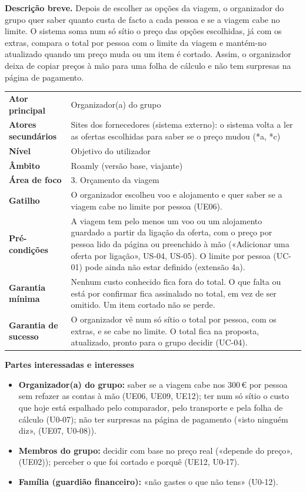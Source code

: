 \documentclass[11pt,a4paper]{article}
\newcommand{\reg}[1]{{\footnotesize\textcolor{pendente}{(#1)}}}
\newenvironment{usecase}[2]{%
  \par\medskip\noindent{\large\bfseries\color{roamly}#1: #2}\par\smallskip\small\noindent\ignorespaces}{\par\medskip}
\newcommand{\ucField}[2]{\textbf{#1} & #2 \\}
\begin{document}
\begin{usecase}{UC-02}{Saber o total real por pessoa}
\textbf{Descrição breve.} Depois de escolher as opções da viagem, o organizador do grupo quer saber quanto custa de facto a cada pessoa e se a viagem cabe no limite. O sistema soma num só sítio o preço das opções escolhidas, já com os extras, compara o total por pessoa com o limite da viagem e mantém-no atualizado quando um preço muda ou um item é cortado. Assim, o organizador deixa de copiar preços à mão para uma folha de cálculo e não tem surpresas na página de pagamento.\par\smallskip
\begin{tabularx}{\textwidth}{@{}>{\raggedright\arraybackslash}p{3.4cm}L@{}}
\toprule
\ucField{Ator principal}{Organizador(a) do grupo}
\ucField{Atores secundários}{Sites dos fornecedores (sistema externo): o sistema volta a ler as ofertas escolhidas para saber se o preço mudou (*a, *c)}
\ucField{Nível}{Objetivo do utilizador}
\ucField{Âmbito}{Roamly (versão base, viajante)}
\ucField{Área de foco}{3. Orçamento da viagem}
\ucField{Gatilho}{O organizador escolheu voo e alojamento e quer saber se a viagem cabe no limite por pessoa \reg{UE06}.}
\ucField{Pré-condições}{A viagem tem pelo menos um voo ou um alojamento guardado a partir da ligação da oferta, com o preço por pessoa lido da página ou preenchido à mão («Adicionar uma oferta por ligação», US-04, US-05). O limite por pessoa (UC-01) pode ainda não estar definido (extensão 4a).}
\ucField{Garantia mínima}{Nenhum custo conhecido fica fora do total. O que falta ou está por confirmar fica assinalado no total, em vez de ser omitido. Um item cortado não se perde.}
\ucField{Garantia de sucesso}{O organizador vê num só sítio o total por pessoa, com os extras, e se cabe no limite. O total fica na proposta, atualizado, pronto para o grupo decidir (UC-04).}
\bottomrule
\end{tabularx}

\medskip
\textbf{Partes interessadas e interesses}
\begin{itemize}
  \item \textbf{Organizador(a) do grupo:} saber se a viagem cabe nos 300\,€ por pessoa sem refazer as contas à mão \reg{UE06, UE09, UE12}; ter num só sítio o custo que hoje está espalhado pelo comparador, pelo transporte e pela folha de cálculo \reg{U0-07}; não ter surpresas na página de pagamento («isto ninguém diz», \reg{UE07, U0-08}).
  \item \textbf{Membros do grupo:} decidir com base no preço real («depende do preço», \reg{UE02}); perceber o que foi cortado e porquê \reg{UE12, U0-17}.
  \item \textbf{Família (guardião financeiro):} «não gastes o que não tens» \reg{U0-12}.
\end{itemize}


\end{usecase}
\end{document}
